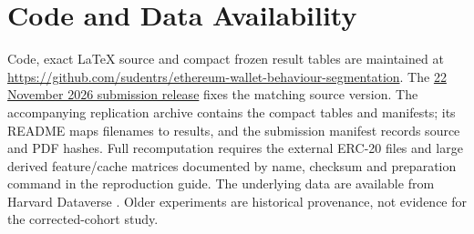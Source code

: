 \documentclass[journal,letterpaper]{IEEEtran}
\begin{document}
\section*{Code and Data Availability}
Code, exact \LaTeX{} source and compact frozen result tables are maintained at \url{https://github.com/sudentrs/ethereum-wallet-behaviour-segmentation}. The \href{https://github.com/sudentrs/ethereum-wallet-behaviour-segmentation/tree/tcss-submission-2026-11-22-v2}{22 November 2026 submission release} fixes the matching source version. The accompanying replication archive contains the compact tables and manifests; its README maps filenames to results, and the submission manifest records source and PDF hashes. Full recomputation requires the external ERC-20 files and large derived feature/cache matrices documented by name, checksum and preparation command in the reproduction guide. The underlying data are available from Harvard Dataverse \cite{somin2025erc2022,somin2025dataset}. Older experiments are historical provenance, not evidence for the corrected-cohort study.
\end{document}
